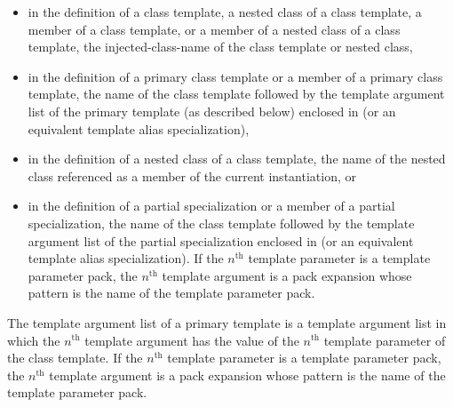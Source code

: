 \begin{itemize}
\item
in the definition of a class template, a nested class of a class template,
a member of a class template, or a member of a nested class of a class template,
the injected-class-name of the class template or nested class,
\item
in the definition of a primary class template
or a member of a primary class template, the name of the
class template followed by the template argument list of the
primary template (as described below) enclosed in
\tcode{<>} (or an equivalent template alias specialization),
\item
in the definition of a nested class of a class template,
the name of the nested class referenced as a member of the
current instantiation, or
\item
in the definition of a partial specialization
or a member of a partial specialization, the name of
the class template followed by the template argument list of
the partial specialization enclosed in
\tcode{<>} (or an equivalent template alias specialization).
If the $n^\text{th}$ template parameter is
a template parameter pack, the $n^\text{th}$ template argument is a pack
expansion whose pattern is the name of
the template parameter pack.
\end{itemize}

\pnum
The template argument list of a primary template is a
template argument list in which the
$n^\text{th}$
template argument has the value of the
$n^\text{th}$
template parameter of the class template.
If the $n^\text{th}$ template parameter is a template
parameter pack, the $n^\text{th}$ template argument is a pack
expansion whose pattern is the name of
the template parameter pack.

